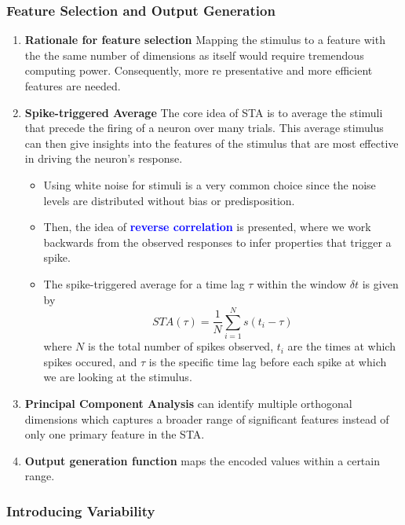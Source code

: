 \documentclass[11pt]{article}
\begin{document}
\subsubsection{Feature Selection and Output Generation}

\begin{enumerate}
    \item \textbf{Rationale for feature selection} Mapping the stimulus to a feature with the the same number of dimensions as itself would require tremendous computing power. Consequently, more re presentative and more efficient features are needed.
    \item \textbf{Spike-triggered Average} The core idea of STA is to average the stimuli that precede the firing of a neuron over many trials. This average stimulus can then give insights into the features of the stimulus that are most effective in driving the neuron's response. 
    \begin{itemize}
        \item Using white noise for stimuli is a very common choice since the noise levels are distributed without bias or predisposition.
        \item Then, the idea of \textcolor{Blue}{\textbf{reverse correlation}} is presented, where we work backwards from the observed responses to infer properties that trigger a spike.
        \item The spike-triggered average for a time lag $\tau$ within the window $\delta t$ is given by \begin{equation*}
            STA(\tau) = \frac{1}{N} \sum_{i=1}^N s(t_i-\tau)
        \end{equation*}
        where $N$ is the total number of spikes observed, $t_i$ are the times at which spikes occured, and $\tau$ is the specific time lag before each spike at which we are looking at the stimulus.
    \end{itemize}
    \item \textbf{Principal Component Analysis} can identify multiple orthogonal dimensions which captures a broader range of significant features instead of only one primary feature in the STA.
    \item \textbf{Output generation function} maps the encoded values within a certain range.
\end{enumerate}

\subsubsection{Introducing Variability}
\end{document}
